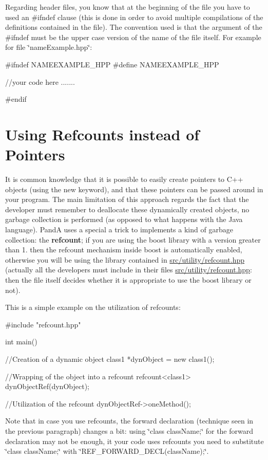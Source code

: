 Regarding header files, you know that at the beginning of the file you have to used an {\ttfamily \#ifndef} clause (this is done in order to avoid multiple compilations of the definitions contained in the file). The convention used is that the argument of the {\ttfamily \#ifndef} must be the upper case version of the name of the file itself. For example for file \char`\"{}name\+Example.\+hpp\char`\"{}\+: \begin{DoxyVerb}#ifndef NAMEEXAMPLE_HPP
#define NAMEEXAMPLE_HPP

//your code here .......

#endif
\end{DoxyVerb}
\hypertarget{programming_style_refcounts_how_to}{}\section{Using Refcounts instead of Pointers}\label{programming_style_refcounts_how_to}
It is common knowledge that it is possible to easily create pointers to C++ objects (using the {\ttfamily new} keyword), and that these pointers can be passed around in your program. The main limitation of this approach regards the fact that the developer must remember to deallocate these dynamically created objects, no garbage collection is performed (as opposed to what happens with the Java language). PandA uses a special a trick to implements a kind of garbage collection\+: the {\bfseries refcount}; if you are using the boost library with a version greater than 1. then the refcount mechanism inside boost is automatically enabled, otherwise you will be using the library contained in \hyperlink{refcount_8hpp}{src/utility/refcount.\+hpp} (actually all the developers must include in their files \hyperlink{refcount_8hpp}{src/utility/refcount.\+hpp}\+: then the file itself decides whether it is appropriate to use the boost library or not).

This is a simple example on the utilization of refcounts\+: \begin{DoxyVerb}#include "refcount.hpp"

int main()
{
   //Creation of a dynamic object
   class1 *dynObject = new class1();

   //Wrapping of the object into a refcount
   refcount<class1> dynObjectRef(dynObject);

   //Utilization of the refcount
   dynObjectRef->oneMethod();
}
\end{DoxyVerb}


Note that in case you use refcounts, the forward declaration (technique seen in the previous paragraph) changes a bit\+: using \char`\"{}class class\+Name;\char`\"{} for the forward declaration may not be enough, it your code uses refcounts you need to substitute \char`\"{}class class\+Name;\char`\"{} with \char`\"{}\+R\+E\+F\+\_\+\+F\+O\+R\+W\+A\+R\+D\+\_\+\+D\+E\+C\+L(class\+Name);\char`\"{}.

